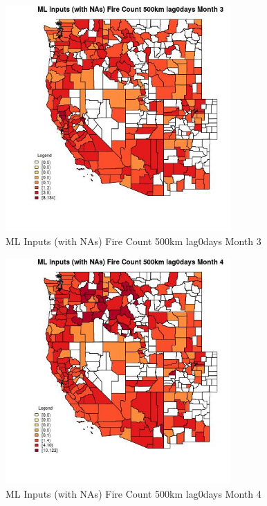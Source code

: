 \begin{figure} 
\centering  
\includegraphics[width=0.77\textwidth]{Code_Outputs/Report_ML_input_PM25_Step4_part_e_de_duplicated_aves_compiled_2019-05-21wNAs_CountyFire_Count_500km_lag0daysmedianMonth3.jpg} 
\caption{\label{fig:Report_ML_input_PM25_Step4_part_e_de_duplicated_aves_compiled_2019-05-21wNAsCountyFire_Count_500km_lag0daysmedianMonth3}ML Inputs (with NAs) Fire Count 500km lag0days Month 3} 
\end{figure} 
 

\begin{figure} 
\centering  
\includegraphics[width=0.77\textwidth]{Code_Outputs/Report_ML_input_PM25_Step4_part_e_de_duplicated_aves_compiled_2019-05-21wNAs_CountyFire_Count_500km_lag0daysmedianMonth4.jpg} 
\caption{\label{fig:Report_ML_input_PM25_Step4_part_e_de_duplicated_aves_compiled_2019-05-21wNAsCountyFire_Count_500km_lag0daysmedianMonth4}ML Inputs (with NAs) Fire Count 500km lag0days Month 4} 
\end{figure} 
 

